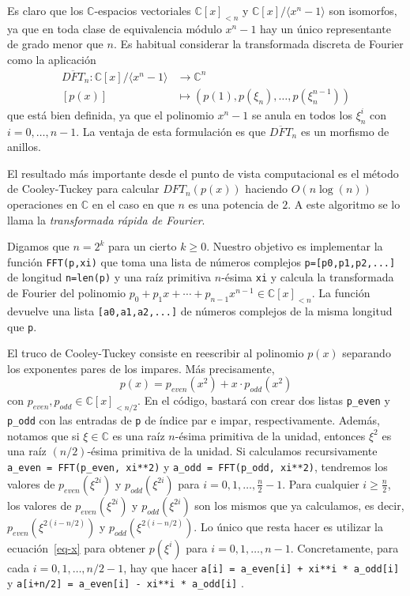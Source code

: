 \documentclass[a4paper, 11pt]{article}
\newcommand{\CC}{\mathbb{C}}
\theoremstyle{plain}
\theoremstyle{definition}
\begin{document}
Es claro que los $\CC$-espacios vectoriales $\CC[x]_{<n}$ y
$\CC[x]/\langle x^n-1\rangle$ son isomorfos, ya que en toda clase de
equivalencia módulo $x^n-1$ hay un único representante de grado menor
que $n$. Es habitual considerar la transformada discreta de Fourier
como la aplicación
\[
\begin{aligned}
   \overline{DFT}_n:\CC[x]/\langle x^n-1\rangle & \longrightarrow \CC^n \\
   [p(x)] & \mapsto \left(p(1),p(\xi_n),\ldots,p(\xi_n^{n-1})\right)
\end{aligned}
\]
que está bien definida, ya que el polinomio $x^n-1$ se anula en todos
los $\xi_n^i$ con $i=0,\ldots,n-1$. La ventaja de esta formulación es
que $\overline{DFT}_n$ es un morfismo de anillos.

\bigskip

El resultado más importante desde el punto de vista computacional es el
método de Cooley-Tuckey para calcular $DFT_n(p(x))$ haciendo $O(n\log(n))$
operaciones en $\CC$ en el caso en que $n$ es una potencia de $2$. A este
algoritmo se lo llama la \emph{transformada rápida de Fourier}.

\bigskip

Digamos que $n=2^k$ para un cierto $k\geq 0$. Nuestro objetivo es implementar
la función \texttt{FFT(p,xi)} que toma una lista de números complejos
\texttt{p=[p0,p1,p2,...]} de longitud \texttt{n=len(p)} y una raíz
primitiva $n$-ésima \texttt{xi} y calcula la transformada de Fourier del
polinomio $p_0+p_1x+\cdots+p_{n-1}x^{n-1}\in\CC[x]_{<n}$. La función
devuelve una lista \texttt{[a0,a1,a2,...]} de números complejos de
la misma longitud que \texttt{p}.

\bigskip

El truco de Cooley-Tuckey consiste en reescribir al polinomio $p(x)$
separando los exponentes pares de los impares. Más precisamente,
\begin{equation}\label{eq-x}
   p(x) = p_{even}(x^2) + x\cdot p_{odd}(x^2)
\end{equation}
con $p_{even},p_{odd}\in\CC[x]_{<n/2}$. En el código, bastará con
crear dos listas \texttt{p\_even} y \texttt{p\_odd} con las entradas de
\texttt{p} de índice par e impar, respectivamente. Además, notamos
que si $\xi\in\CC$ es una raíz $n$-ésima primitiva de la unidad,
entonces $\xi^2$ es una raíz $(n/2)$-ésima primitiva de la unidad.
Si calculamos recursivamente \texttt{a\_even = FFT(p\_even, xi**2)} y
\texttt{a\_odd = FFT(p\_odd, xi**2)}, tendremos los valores de
$p_{even}(\xi^{2i})$ y $p_{odd}(\xi^{2i})$ para
$i=0,1,\ldots,\frac{n}2-1$. Para cualquier $i\geq\frac{n}2$, los
valores de $p_{even}(\xi^{2i})$ y $p_{odd}(\xi^{2i})$ son los mismos
que ya calculamos, es decir, $p_{even}(\xi^{2(i-n/2)})$ y
$p_{odd}(\xi^{2(i-n/2)})$. Lo único que resta hacer es utilizar la
ecuación~\eqref{eq-x} para obtener $p(\xi^i)$ para $i=0,1,\ldots,n-1$.
Concretamente, para cada $i=0,1,\ldots,n/2-1$, hay que hacer
\texttt{a[i] = a\_even[i] + xi**i * a\_odd[i]} y
\texttt{a[i+n/2] = a\_even[i] - xi**i * a\_odd[i]} .
\end{document}
